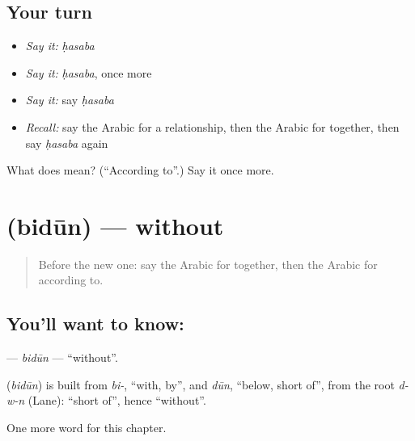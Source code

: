 \subsection*{Your turn}
\begin{itemize}
\raggedright
  \item \emph{Say it:} \emph{ḥasaba}
  \item \emph{Say it:} \emph{ḥasaba}, once more
  \item \emph{Say it:} say \emph{ḥasaba}
  \item \emph{Recall:} say the Arabic for a relationship, then the Arabic for together, then say \emph{ḥasaba} again
\end{itemize}

\begin{tcolorbox}[breakable,colback=teal!4,colframe=teal!35!black,title={Before you move on}]
What does  mean? (\textquotedblleft{}According to\textquotedblright{}.) Say it once more.
\end{tcolorbox}
\section[\texorpdfstring{\ar{بدون} (bidūn)}{بدون (bidūn)}]{ (bidūn) — without}

\label{lesson:AR-C268-bidun}



\begin{quote}
Before the new one: say the Arabic for together, then the Arabic for according to.
\end{quote}

\subsection*{You'll want to know: }
\textbf{} — \emph{bidūn} — \textquotedblleft{}without\textquotedblright{}.

\begin{cousinweb}
\textbf{} (\emph{bidūn}) is built from \emph{bi-}, \textquotedblleft{}with, by\textquotedblright{}, and \emph{dūn}, \textquotedblleft{}below, short of\textquotedblright{}, from the root \emph{d-w-n} (Lane): \textquotedblleft{}short of\textquotedblright{}, hence \textquotedblleft{}without\textquotedblright{}.
\end{cousinweb}

\begin{grammarlens}[title={What you've built}]
One more word for this chapter.
\end{grammarlens}

